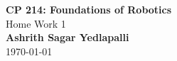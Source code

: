 \begin{titlepage}
    \centering
    \vspace*{1.5in}

    {\LARGE \textbf{CP 214: Foundations of Robotics}} \\[0.5cm]
    {\Large Home Work 1} \\[1.5cm]

    {\large \textbf{Ashrith Sagar Yedlapalli}} \\[0.5cm]
    \today \\[1.5cm]

    \vfill
\end{titlepage}
